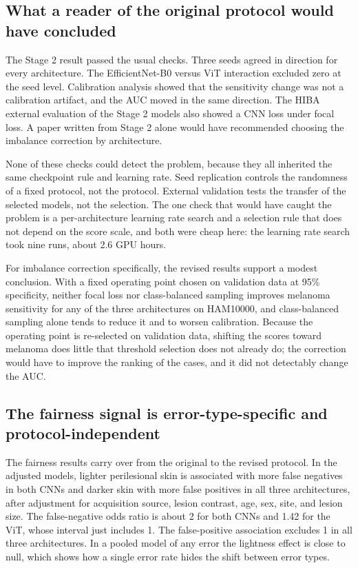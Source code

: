 \subsection{What a reader of the original protocol would have concluded}

The Stage 2 result passed the usual checks. Three seeds agreed in direction for every architecture. The EfficientNet-B0 versus ViT interaction excluded zero at the seed level. Calibration analysis showed that the sensitivity change was not a calibration artifact, and the AUC moved in the same direction. The HIBA external evaluation of the Stage 2 models also showed a CNN loss under focal loss. A paper written from Stage 2 alone would have recommended choosing the imbalance correction by architecture.

None of these checks could detect the problem, because they all inherited the same checkpoint rule and learning rate. Seed replication controls the randomness of a fixed protocol, not the protocol. External validation tests the transfer of the selected models, not the selection. The one check that would have caught the problem is a per-architecture learning rate search and a selection rule that does not depend on the score scale, and both were cheap here: the learning rate search took nine runs, about 2.6 GPU hours.

For imbalance correction specifically, the revised results support a modest conclusion. With a fixed operating point chosen on validation data at 95\% specificity, neither focal loss nor class-balanced sampling improves melanoma sensitivity for any of the three architectures on HAM10000, and class-balanced sampling alone tends to reduce it and to worsen calibration. Because the operating point is re-selected on validation data, shifting the scores toward melanoma does little that threshold selection does not already do; the correction would have to improve the ranking of the cases, and it did not detectably change the AUC.

\subsection{The fairness signal is error-type-specific and protocol-independent}

The fairness results carry over from the original to the revised protocol. In the adjusted models, lighter perilesional skin is associated with more false negatives in both CNNs and darker skin with more false positives in all three architectures, after adjustment for acquisition source, lesion contrast, age, sex, site, and lesion size. The false-negative odds ratio is about 2 for both CNNs and 1.42 for the ViT, whose interval just includes 1. The false-positive association excludes 1 in all three architectures. In a pooled model of any error the lightness effect is close to null, which shows how a single error rate hides the shift between error types.

